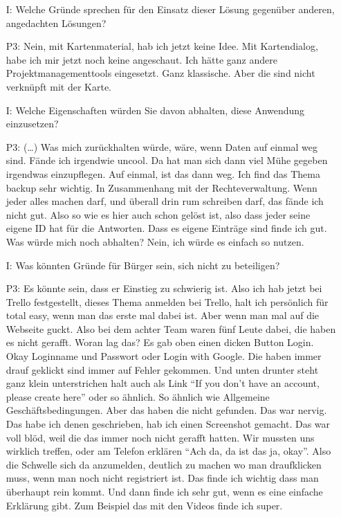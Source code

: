 \begin{itemize}
    \item[I:] Welche Gr{\"u}nde sprechen f{\"u}r den Einsatz dieser L{\"o}sung gegen{\"u}ber anderen, angedachten L{\"o}sungen?
    \item[P3:] Nein, mit Kartenmaterial, hab ich jetzt keine Idee. Mit Kartendialog, habe ich mir jetzt noch keine angeschaut. Ich h{\"a}tte ganz andere Projektmanagementtools eingesetzt. Ganz klassische. Aber die sind nicht verkn{\"u}pft mit der Karte.
    \item[I:] Welche Eigenschaften w{\"u}rden Sie davon abhalten, diese Anwendung einzusetzen?
    \item[P3:] (\dots) Was mich zur{\"u}ckhalten w{\"u}rde, w{\"a}re, wenn Daten auf einmal weg sind. F{\"a}nde ich irgendwie uncool. Da hat man sich dann viel M{\"u}he gegeben irgendwas einzupflegen. Auf einmal, ist das dann weg. Ich find das Thema backup sehr wichtig. In Zusammenhang mit der Rechteverwaltung. Wenn jeder alles machen darf, und {\"u}berall drin rum schreiben darf, das f{\"a}nde ich nicht gut. Also so wie es hier auch schon gel{\"o}st ist, also dass jeder seine eigene ID hat f{\"u}r die Antworten. Dass es eigene Eintr{\"a}ge sind finde ich gut. Was w{\"u}rde mich noch abhalten? Nein, ich w{\"u}rde es einfach so nutzen.
    \item[I:] Was k{\"o}nnten Gr{\"u}nde f{\"u}r B{\"u}rger sein, sich nicht zu beteiligen?
    \item[P3:] Es k{\"o}nnte sein, dass er Einstieg zu schwierig ist. Also ich hab jetzt bei Trello festgestellt, dieses Thema anmelden bei Trello, halt ich pers{\"o}nlich f{\"u}r total easy, wenn man das erste mal dabei ist. Aber wenn man mal auf die Webseite guckt. Also bei dem achter Team waren f{\"u}nf Leute dabei, die haben es nicht gerafft. Woran lag das? Es gab oben einen dicken Button Login. Okay Loginname und Passwort oder Login with Google. Die haben immer drauf geklickt sind immer auf Fehler gekommen. Und unten drunter steht ganz klein unterstrichen halt auch als Link "`If you don't have an account, please create here"' oder so {\"a}hnlich. So {\"a}hnlich wie Allgemeine Gesch{\"a}ftsbedingungen. Aber das haben die nicht gefunden. Das war nervig. Das habe ich denen geschrieben, hab ich einen Screenshot gemacht. Das war voll bl{\"o}d, weil die das immer noch nicht gerafft hatten. Wir mussten uns wirklich treffen, oder am Telefon erkl{\"a}ren "`Ach da, da ist das ja, okay"'. Also die Schwelle sich da anzumelden, deutlich zu machen wo man draufklicken muss, wenn man noch nicht registriert ist. Das finde ich wichtig dass man {\"u}berhaupt rein kommt. Und dann finde ich sehr gut, wenn es eine einfache Erkl{\"a}rung gibt. Zum Beispiel das mit den Videos finde ich super.
\end{itemize}

